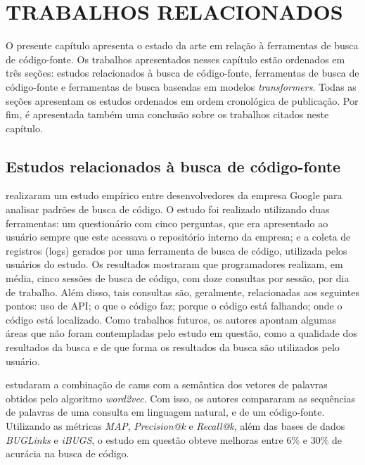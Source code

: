 \chapter{TRABALHOS RELACIONADOS}
\label{chp:relatedWorks}

O presente capítulo apresenta o estado da arte em relação à ferramentas de busca de código-fonte. Os trabalhos apresentados nesses capítulo estão ordenados em três seções: estudos relacionados à busca de código-fonte, ferramentas de busca de código-fonte e ferramentas de busca baseadas em modelos \textit{transformers}. Todas as seções apresentam os estudos ordenados em ordem cronológica de publicação. Por fim, é apresentada também uma conclusão sobre os trabalhos citados neste capítulo.

\section{Estudos relacionados à busca de código-fonte}
\textcite{Sadowski2015HowDS} realizaram um estudo empírico entre desenvolvedores da empresa Google para analisar padrões de busca de código. O estudo foi realizado utilizando duas ferramentas: um questionário com cinco perguntas, que era apresentado ao usuário sempre que este acessava o repositório interno da empresa; e a coleta de registros (logs) gerados por uma ferramenta de busca de código, utilizada pelos usuários do estudo. Os resultados mostraram que programadores realizam, em média, cinco sessões de busca de código, com doze consultas por sessão, por dia de trabalho. Além disso, tais consultas são, geralmente, relacionadas aos seguintes pontos: uso de API; o que o código faz; porque o código está falhando; onde o código está localizado. Como trabalhos futuros, os autores apontam algumas áreas que não foram contempladas pelo estudo em questão, como a qualidade dos resultados da busca e de que forma os resultados da busca são utilizados pelo usuário. 

\textcite{Akbar2019SCORSC} estudaram a combinação de \glspl{cam} com a semântica dos vetores de palavras obtidos pelo algoritmo \textit{word2vec}. Com isso, os autores compararam as sequências de palavras de uma consulta em linguagem natural, e de um código-fonte. Utilizando as métricas \textit{MAP}, \textit{Precision@k} e \textit{Recall@k}, além das bases de dados \textit{BUGLinks} e \textit{iBUGS}, o estudo em questão obteve melhoras entre $6\%$ e $30\%$ de acurácia na busca de código.

